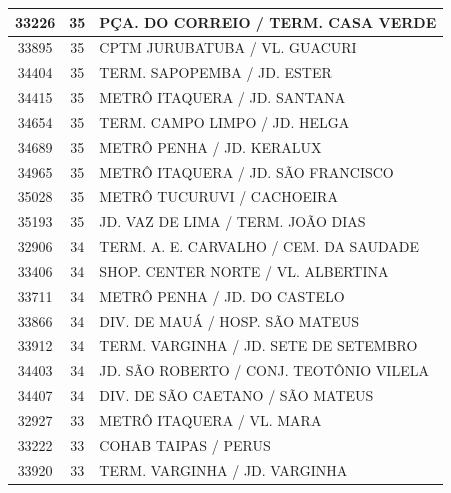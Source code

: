 \documentclass[
	12pt,				%
	oneside,			%
	a4paper,			%
	english,			%
	brazil				%
	]{abntex2ppgsi}
\begin{document}
{{\begin{apendicesenv}
\begin{longtable}{c|c|p{7cm}}
    33226 & 35    & PÇA. DO CORREIO / TERM. CASA VERDE \\
\hline

    33895 & 35    & CPTM JURUBATUBA / VL. GUACURI \\
\hline

    34404 & 35    & TERM. SAPOPEMBA / JD. ESTER \\
\hline

    34415 & 35    & METRÔ ITAQUERA / JD. SANTANA \\
\hline

    34654 & 35    & TERM. CAMPO LIMPO / JD. HELGA \\
\hline

    34689 & 35    & METRÔ PENHA / JD. KERALUX \\
\hline

    34965 & 35    & METRÔ ITAQUERA / JD. SÃO FRANCISCO \\
\hline

    35028 & 35    & METRÔ TUCURUVI / CACHOEIRA \\
\hline

    35193 & 35    & JD. VAZ DE LIMA / TERM. JOÃO DIAS \\
\hline

    32906 & 34    & TERM. A. E. CARVALHO / CEM. DA SAUDADE \\
\hline

    33406 & 34    & SHOP. CENTER NORTE / VL. ALBERTINA \\
\hline

    33711 & 34    & METRÔ PENHA / JD. DO CASTELO \\
\hline

    33866 & 34    & DIV. DE MAUÁ / HOSP. SÃO MATEUS \\
\hline

    33912 & 34    & TERM. VARGINHA / JD. SETE DE SETEMBRO \\
\hline

    34403 & 34    & JD. SÃO ROBERTO / CONJ. TEOTÔNIO VILELA \\
\hline

    34407 & 34    & DIV. DE SÃO CAETANO / SÃO MATEUS \\
\hline

    32927 & 33    & METRÔ ITAQUERA / VL. MARA \\
\hline

    33222 & 33    & COHAB TAIPAS / PERUS \\
\hline

    33920 & 33    & TERM. VARGINHA / JD. VARGINHA \\
\hline


\end{longtable}
\end{apendicesenv}}}
\end{document}
